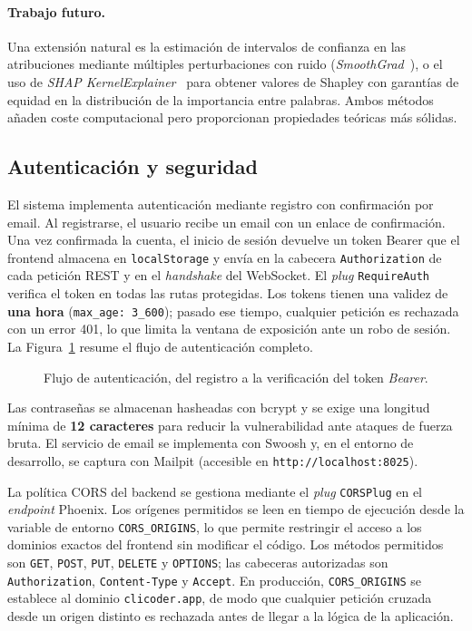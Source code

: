 \paragraph{Trabajo futuro.}
Una extensión natural es la estimación de intervalos de confianza en las atribuciones mediante múltiples perturbaciones con ruido (\emph{SmoothGrad}~\cite{Smilkov17}), o el uso de \emph{SHAP KernelExplainer}~\cite{Lundberg17} para obtener valores de Shapley con garantías de equidad en la distribución de la importancia entre palabras. Ambos métodos añaden coste computacional pero proporcionan propiedades teóricas más sólidas.

\subsection{Autenticación y seguridad}
\label{sec:seguridad}

El sistema implementa autenticación mediante registro con confirmación por email. Al registrarse, el usuario recibe un email con un enlace de confirmación. Una vez confirmada la cuenta, el inicio de sesión devuelve un token Bearer que el frontend almacena en \texttt{localStorage} y envía en la cabecera \texttt{Authorization} de cada petición REST y en el \emph{handshake} del WebSocket. El \emph{plug} \texttt{RequireAuth} verifica el token en todas las rutas protegidas. Los tokens tienen una validez de \textbf{una hora} (\texttt{max\_age: 3\_600}); pasado ese tiempo, cualquier petición es rechazada con un error 401, lo que limita la ventana de exposición ante un robo de sesión. La Figura~\ref{fig:auth-flujo} resume el flujo de autenticación completo.

\begin{figure}[ht]
\centering
\resizebox{0.9\textwidth}{!}{}
\caption{Flujo de autenticación, del registro a la verificación del token \emph{Bearer}.}
\label{fig:auth-flujo}
\end{figure}

Las contraseñas se almacenan hasheadas con bcrypt y se exige una longitud mínima de \textbf{12 caracteres} para reducir la vulnerabilidad ante ataques de fuerza bruta. El servicio de email se implementa con Swoosh y, en el entorno de desarrollo, se captura con Mailpit (accesible en \texttt{http://localhost:8025}).

La política CORS del backend se gestiona mediante el \emph{plug} \texttt{CORSPlug} en el \emph{endpoint} Phoenix. Los orígenes permitidos se leen en tiempo de ejecución desde la variable de entorno \texttt{CORS\_ORIGINS}, lo que permite restringir el acceso a los dominios exactos del frontend sin modificar el código. Los métodos permitidos son \texttt{GET}, \texttt{POST}, \texttt{PUT}, \texttt{DELETE} y \texttt{OPTIONS}; las cabeceras autorizadas son \texttt{Authorization}, \texttt{Content-Type} y \texttt{Accept}. En producción, \texttt{CORS\_ORIGINS} se establece al dominio \texttt{clicoder.app}, de modo que cualquier petición cruzada desde un origen distinto es rechazada antes de llegar a la lógica de la aplicación.

